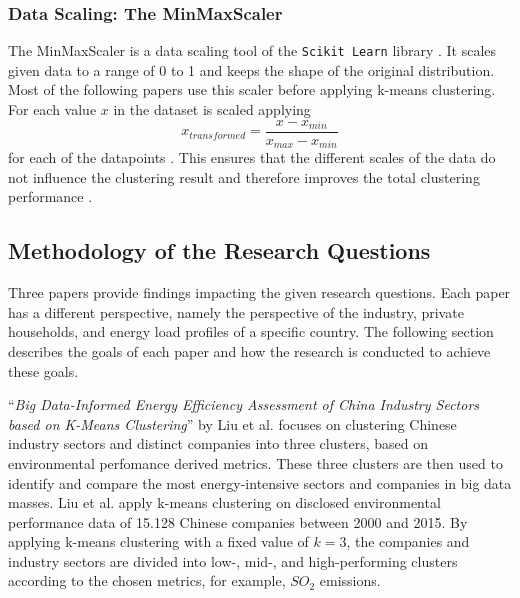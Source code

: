 \subsubsection{Data Scaling: The MinMaxScaler}
The MinMaxScaler is a data scaling tool of the \texttt{Scikit Learn} library \cite{SKL-MMS}.
It scales given data to a range of 0 to 1 and keeps the shape of the original distribution.
Most of the following papers use this scaler before applying k-means clustering.
For each value $x$ in the dataset is scaled applying \begin{equation}\label{eq:minmaxscaler} 
      x_{transformed} = \frac{x - x_{min}}{x_{max} - x_{min}}
\end{equation} for each of the datapoints \cite{JOJ-ENP}.
This ensures that the different scales of the data do not influence the clustering result and therefore improves the total clustering performance \cite{GOG-WSI}.

\subsection{Methodology of the Research Questions}
\label{sec:methodology_of_the_research_questions}
Three papers provide findings impacting the given research questions.
Each paper has a different perspective, namely the perspective of the industry, private households, and energy load profiles of a specific country.
The following section describes the goals of each paper and how the research is conducted to achieve these goals.

\enquote{\textit{Big Data-Informed Energy Efficiency Assessment of China Industry Sectors based on K-Means Clustering}} by Liu et al. \cite{LIU-BDE} focuses on clustering Chinese industry sectors and distinct companies into three clusters, based on environmental perfomance derived metrics.
These three clusters are then used to identify and compare the most energy-intensive sectors and companies in big data masses.
Liu et al. apply k-means clustering on disclosed environmental performance data of 15.128 Chinese companies between 2000 and 2015.
By applying k-means clustering with a fixed value of $k=3$, the companies and industry sectors are divided into low-, mid-, and high-performing clusters according to the chosen metrics, for example, $SO_2$ emissions.

